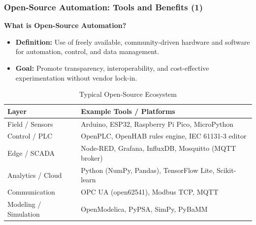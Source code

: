 \begin{frame}
	\frametitle{Open-Source Automation: Tools and Benefits (1)}
  \textbf{What is Open-Source Automation?}
  \begin{itemize}
      \item \textbf{Definition:} Use of freely available, community-driven hardware and software for automation, control, and data management.
      \item \textbf{Goal:} Promote transparency, interoperability, and cost-effective experimentation without vendor lock-in.
  \end{itemize}
  \vspace{3mm}
  \begin{table}
    \centering
    \scriptsize
    \begin{tabular}{@{}p{3.0cm} p{7.5cm}@{}}
      \toprule
      \textbf{Layer} & \textbf{Example Tools / Platforms} \\
      \midrule
      Field / Sensors        & Arduino, ESP32, Raspberry Pi Pico, MicroPython \\
      Control / PLC          & OpenPLC, OpenHAB rules engine, IEC 61131-3 editor \\
      Edge / SCADA           & Node-RED, Grafana, InfluxDB, Mosquitto (MQTT broker) \\
      Analytics / Cloud      & Python (NumPy, Pandas), TensorFlow Lite, Scikit-learn \\
      Communication          & OPC UA (open62541), Modbus TCP, MQTT \\
      Modeling / Simulation  & OpenModelica, PyPSA, SimPy, PyBaMM \\
      \bottomrule
    \end{tabular}
    \caption{Typical Open-Source Ecosystem}
  \end{table}
\end{frame}

